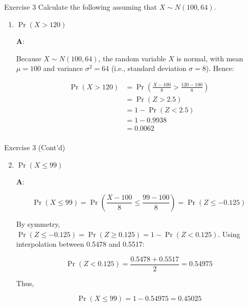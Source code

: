 \documentclass[
  ignorenonframetext,
  aspectratio=43,
]{beamer}
\let\olditem\item
\renewcommand\item{\olditem\justifying}
\begin{document}
\begin{frame}{Exercise 3}
\protect\hypertarget{exercise-3}{}
Calculate the following assuming that \(X \sim N(100,64)\).

\begin{enumerate}
\item
  \(\Pr(X > 120)\)

  \pause

  \textbf{A}:

  Because \(X \sim N(100, 64)\), the random variable \(X\) is normal,
  with mean \(\mu = 100\) and variance \(\sigma^2 = 64\) (i.e., standard
  deviation \(\sigma = 8\)). Hence:

  \[
  \begin{aligned}
  \Pr(X > 120) 
  &= \Pr\left( \frac{X - 100}{8} > \frac{120 - 100}{8} \right) \\
  &= \Pr(Z > 2.5) \\
  &= 1 - \Pr(Z < 2.5) \\ 
  &= 1 - 0.9938 \\
  &= 0.0062 \\
  \end{aligned}
  \]
\end{enumerate}
\end{frame}

\begin{frame}{Exercise 3 (Cont'd)}
\protect\hypertarget{exercise-3-contd}{}
\begin{enumerate}
\setcounter{enumi}{1}
\item
  \(\Pr(X \leq 99)\)

  \pause

  \textbf{A}: \vspace{-20pt}

  \[
  \Pr(X \le 99) 
  = \Pr\left( \frac{X - 100}{8} \le \frac{99 - 100}{8} \right) 
  = \Pr(Z \le -0.125)
  \]

  By symmetry,
  \(\Pr(Z \le -0.125) = \Pr(Z \ge 0.125) = 1 - \Pr(Z < 0.125)\). Using
  interpolation between 0.5478 and 0.5517:

  \[
  \Pr(Z < 0.125) = \frac{0.5478 + 0.5517}{2} = 0.54975
  \]

  Thus,

  \[
  \Pr(X \le 99) = 1 - 0.54975 = 0.45025
  \]
\end{enumerate}
\end{frame}
\end{document}
